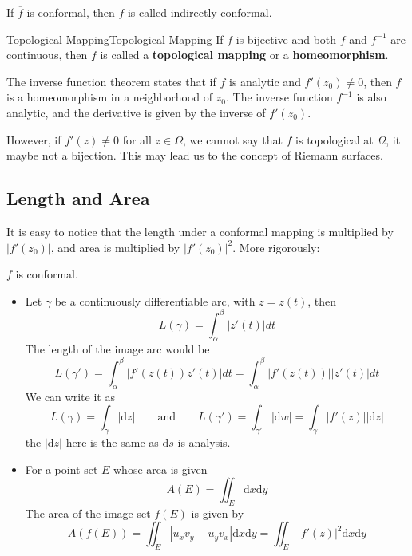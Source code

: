 \documentclass[../main.tex]{subfiles}
\begin{document}
If $\overline{f}$ is conformal, then $f$ is called indirectly conformal. 
\begin{definition}{Topological Mapping}{Topological Mapping}
	If $f$ is bijective and both $f$ and $f^{-1}$ are continuous, then $f$ is called a \textbf{topological mapping} or a \textbf{homeomorphism}.
\end{definition}
The inverse function theorem states that if $f$ is analytic and $f'(z_0)\neq 0$, then $f$ is a homeomorphism in a neighborhood of $z_0$. The inverse function $f^{-1}$ is also analytic, and the derivative is given by the inverse of $f'(z_0)$.

However, if $f'(z)\neq 0$ for all $z\in \Omega$, we cannot say that $f$ is topological at $\Omega$, it maybe not a bijection. This may lead us to the concept of Riemann surfaces.

\subsection{Length and Area}
It is easy to notice that the length under a conformal mapping is multiplied by $\left|f'(z_0)\right|$, and area is multiplied by $\left|f'(z_0)\right|^2$. More rigorously:

$f$ is conformal.
\begin{itemize}
\item Let  $\gamma$ be a continuously differentiable arc, with $z=z(t)$, then
	\begin{equation*}
		L(\gamma) = \int_{\alpha}^{\beta} \left|z'(t)\right| dt
	\end{equation*}
	The length of the image arc would be
	\begin{equation*}
		L(\gamma') = \int_{\alpha}^{\beta} \left|f'(z(t)) z'(t)\right| dt = \int_{\alpha}^{\beta} \left|f'(z(t))\right| \left|z'(t)\right| dt
	\end{equation*}
	We can write it as
	\begin{equation*}
		L(\gamma) = \int _{\gamma} | \mathrm{d}z| \qquad \text{and} \qquad L(\gamma') = \int_{\gamma'} | \mathrm{d}w| = \int_{\gamma} \left|f'(z)\right| | \mathrm{d}z|
	\end{equation*}
	the $\left|\mathrm{d} z\right|$ here is the same as $\mathrm{d} s$ is analysis.
\item For a point set $E$ whose area is given
	\begin{equation*}
		A(E) = \iint_E \mathrm{d}x \mathrm{d}y
	\end{equation*}
	The area of the image set $f(E)$ is given by
	\begin{equation*}
		A(f(E)) = \iint_{E} \left|u_xv_y-u_yv_x\right|\mathrm{d}x \mathrm{d}y = \iint_E \left|f'(z)\right|^2 \mathrm{d}x \mathrm{d}y
	\end{equation*}
\end{itemize}
\end{document}
